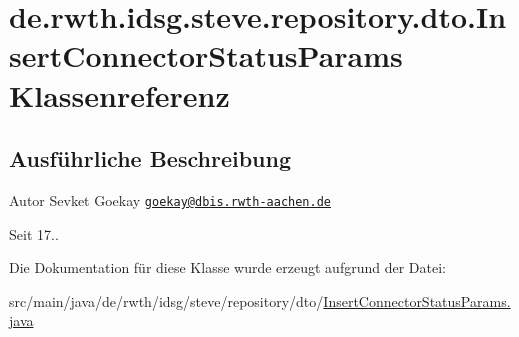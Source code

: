 \hypertarget{classde_1_1rwth_1_1idsg_1_1steve_1_1repository_1_1dto_1_1_insert_connector_status_params}{\section{de.\-rwth.\-idsg.\-steve.\-repository.\-dto.\-Insert\-Connector\-Status\-Params Klassenreferenz}
\label{classde_1_1rwth_1_1idsg_1_1steve_1_1repository_1_1dto_1_1_insert_connector_status_params}
}


\subsection{Ausführliche Beschreibung}
\begin{DoxyAuthor}{Autor}
Sevket Goekay \href{mailto:goekay@dbis.rwth-aachen.de}{\tt goekay@dbis.\-rwth-\/aachen.\-de} 
\end{DoxyAuthor}
\begin{DoxySince}{Seit}
17.. 
\end{DoxySince}


Die Dokumentation für diese Klasse wurde erzeugt aufgrund der Datei\-:\begin{DoxyCompactItemize}
\item 
src/main/java/de/rwth/idsg/steve/repository/dto/\hyperlink{_insert_connector_status_params_8java}{Insert\-Connector\-Status\-Params.\-java}\end{DoxyCompactItemize}
